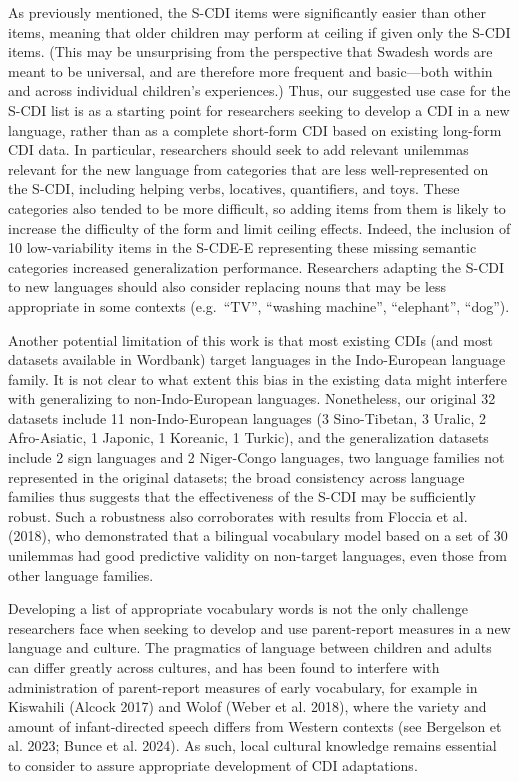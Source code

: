 \documentclass[
  letterpaper,
  DIV=11,
  numbers=noendperiod]{scrartcl}
\begin{document}
As previously mentioned, the S-CDI items were significantly easier than
other items, meaning that older children may perform at ceiling if given
only the S-CDI items. (This may be unsurprising from the perspective
that Swadesh words are meant to be universal, and are therefore more
frequent and basic---both within and across individual children's
experiences.) Thus, our suggested use case for the S-CDI list is as a
starting point for researchers seeking to develop a CDI in a new
language, rather than as a complete short-form CDI based on existing
long-form CDI data. In particular, researchers should seek to add
relevant unilemmas relevant for the new language from categories that
are less well-represented on the S-CDI, including helping verbs,
locatives, quantifiers, and toys. These categories also tended to be
more difficult, so adding items from them is likely to increase the
difficulty of the form and limit ceiling effects. Indeed, the inclusion
of 10 low-variability items in the S-CDE-E representing these missing
semantic categories increased generalization performance. Researchers
adapting the S-CDI to new languages should also consider replacing nouns
that may be less appropriate in some contexts (e.g.~``TV'', ``washing machine'',
``elephant'', ``dog'').

Another potential limitation of this work is that most existing CDIs
(and most datasets available in Wordbank) target languages in the
Indo-European language family. It is not clear to what extent this bias
in the existing data might interfere with generalizing to
non-Indo-European languages. Nonetheless, our original 32 datasets
include 11 non-Indo-European languages (3 Sino-Tibetan, 3 Uralic, 2
Afro-Asiatic, 1 Japonic, 1 Koreanic, 1 Turkic), and the generalization
datasets include 2 sign languages and 2 Niger-Congo languages, two
language families not represented in the original datasets; the broad
consistency across language families thus suggests that the
effectiveness of the S-CDI may be sufficiently robust. Such a robustness
also corroborates with results from Floccia et al. (2018), who
demonstrated that a bilingual vocabulary model based on a set of 30
unilemmas had good predictive validity on non-target languages, even
those from other language families.

Developing a list of appropriate vocabulary words is not the only
challenge researchers face when seeking to develop and use parent-report
measures in a new language and culture. The pragmatics of language
between children and adults can differ greatly across cultures, and has
been found to interfere with administration of parent-report measures of
early vocabulary, for example in Kiswahili (Alcock 2017) and Wolof
(Weber et al. 2018), where the variety and amount of infant-directed
speech differs from Western contexts (see Bergelson et al. 2023; Bunce
et al. 2024). As such, local cultural knowledge remains essential to
consider to assure appropriate development of CDI adaptations.
\end{document}
